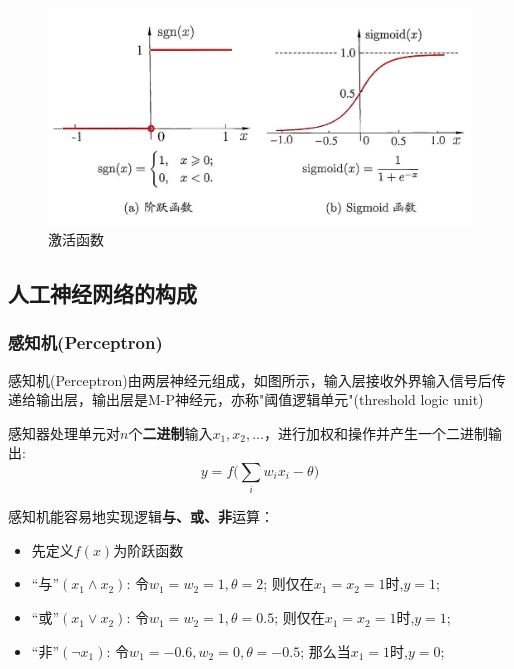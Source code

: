 \begin{figure}[h]
\small
\centering
\includegraphics[width=14cm]{figure//4.jpg}
\caption{激活函数} \label{fig:4}
\end{figure}


\subsection{人工神经网络的构成}
\subsubsection{感知机(Perceptron)}

感知机(Perceptron)由两层神经元组成，如图所示，输入层接收外界输入信号后传递给输出层，输出层是M-P神经元，亦称"阈值逻辑单元"(threshold logic unit)

感知器处理单元对$n$个\textbf{二进制}输入$x_1,x_2,\ldots$，进行加权和操作并产生一个二进制输出:
\[\boxed{y=f\big(\sum_i w_ix_i-\theta\big)}\]

感知机能容易地实现逻辑\textbf{与、或、非}运算：

\begin{itemize}

\item 先定义$f(x)$为阶跃函数

\item “与”$(x_1\wedge x_2)$: 
令$w_1=w_2=1,\theta=2$;
则仅在$x_1=x_2=1$时,$y=1$;

\item “或”$(x_1\vee x_2)$: 
令$w_1=w_2=1,\theta=0.5$;
则仅在$x_1=x_2=1$时,$y=1$;

\item “非”$(\neg x_1)$: 
令$w_1=-0.6,w_2=0,\theta=-0.5$;
那么当$x_1=1$时,$y=0$;
\end{itemize}


